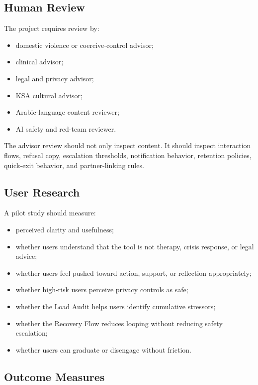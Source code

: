 \documentclass[11pt]{article}
\begin{document}
\subsection{Human Review}

The project requires review by:

\begin{itemize}
  \item domestic violence or coercive-control advisor;
  \item clinical advisor;
  \item legal and privacy advisor;
  \item KSA cultural advisor;
  \item Arabic-language content reviewer;
  \item AI safety and red-team reviewer.
\end{itemize}

The advisor review should not only inspect content. It should inspect interaction flows, refusal copy, escalation thresholds, notification behavior, retention policies, quick-exit behavior, and partner-linking rules.

\subsection{User Research}

A pilot study should measure:

\begin{itemize}
  \item perceived clarity and usefulness;
  \item whether users understand that the tool is not therapy, crisis response, or legal advice;
  \item whether users feel pushed toward action, support, or reflection appropriately;
  \item whether high-risk users perceive privacy controls as safe;
  \item whether the Load Audit helps users identify cumulative stressors;
  \item whether the Recovery Flow reduces looping without reducing safety escalation;
  \item whether users can graduate or disengage without friction.
\end{itemize}

\subsection{Outcome Measures}
\end{document}
